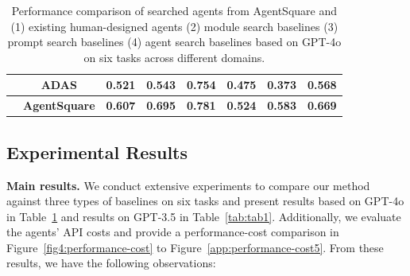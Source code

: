 \begin{table}[t!]
\begin{tabular}{cccccccc}
        & ADAS & 0.521 & 0.543 &  0.754& 0.475 &  0.373& 0.568 \\
    \hline
    \multirow{1}{*}{} 
        & \textbf{AgentSquare} & \textbf{0.607} & \textbf{0.695} & \textbf{0.781} & \textbf{0.524}  & \textbf{0.583} & \textbf{0.669}\\ 
    \hline
    \end{tabular}
    {\caption{Performance comparison of searched agents from AgentSquare and (1) existing human-designed agents (2) module search baselines (3) prompt search baselines (4) agent search baselines based on GPT-4o on six tasks across different domains.}
    \label{tab:tab2}}
\end{table}

\subsection{Experimental Results}
\textbf{Main results.}
We conduct extensive experiments to compare our method against three types of baselines on six tasks and present results based on GPT-4o in Table~\ref{tab:tab2} and results on GPT-3.5 in Table~\ref{tab:tab1}.
Additionally, we evaluate the agents' API costs and provide a performance-cost comparison in Figure~\ref{fig4:performance-cost} to Figure~\ref{app:performance-cost5}.
From these results, we have the following observations:
